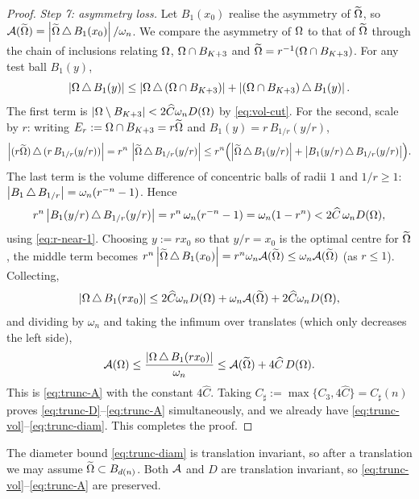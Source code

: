 \begin{proof}
\smallskip
\emph{Step 7: asymmetry loss.}
Let $B_1(x_0)$ realise the asymmetry of $\widetilde{\Omega}$, so
$\mathcal A(\widetilde{\Omega})=\left|\widetilde{\Omega}\,\triangle\,B_1(x_0)\right|/\omega_n$. We compare the
asymmetry of $\Omega$ to that of $\widetilde{\Omega}$ through the chain of inclusions
relating $\Omega$, $\Omega\cap B_{K+3}$ and $\widetilde{\Omega}=r^{-1}(\Omega\cap B_{K+3})$.
For any test ball $B_1(y)$,
\[
   \left|\Omega\,\triangle\,B_1(y)\right|
   \le\left|\Omega\,\triangle\,(\Omega\cap B_{K+3})\right|
     +\left|(\Omega\cap B_{K+3})\,\triangle\,B_1(y)\right|.
\]
The first term is $\left|\Omega\setminus B_{K+3}\right|<2\widehat C\omega_n D(\Omega)$
by \eqref{eq:vol-cut}. For the second, scale by $r$: writing
$E_r:=\Omega\cap B_{K+3}=r\widetilde{\Omega}$ and $B_1(y)=r\,B_{1/r}(y/r)$,
\[
   \left|(r\widetilde{\Omega})\,\triangle\,(r\,B_{1/r}(y/r))\right|
   =r^n\,\left|\widetilde{\Omega}\,\triangle\,B_{1/r}(y/r)\right|
   \le r^n\Bigl(\left|\widetilde{\Omega}\,\triangle\,B_1(y/r)\right|
              +\left|B_1(y/r)\,\triangle\,B_{1/r}(y/r)\right|\Bigr).
\]
The last term is the volume difference of concentric balls of radii $1$
and $1/r\ge1$:
$\left|B_1\,\triangle\,B_{1/r}\right|=\omega_n(r^{-n}-1)$. Hence
\[
   r^n\left|B_1(y/r)\,\triangle\,B_{1/r}(y/r)\right|
   =r^n\,\omega_n(r^{-n}-1)=\omega_n(1-r^n)
   <2\widehat C\,\omega_n D(\Omega),
\]
using \eqref{eq:r-near-1}. Choosing $y:=r x_0$ so that $y/r=x_0$ is the
optimal centre for $\widetilde{\Omega}$, the middle term becomes
$r^n\left|\widetilde{\Omega}\,\triangle\,B_1(x_0)\right|=r^n\omega_n\mathcal A(\widetilde{\Omega})
\le\omega_n\mathcal A(\widetilde{\Omega})$ (as $r\le1$). Collecting,
\[
   \left|\Omega\,\triangle\,B_1(rx_0)\right|
   \le2\widehat C\omega_n D(\Omega)+\omega_n\mathcal A(\widetilde{\Omega})+2\widehat C\omega_n D(\Omega),
\]
and dividing by $\omega_n$ and taking the infimum over translates (which
only decreases the left side),
\begin{equation}\label{eq:trunc-A-pre}
   \mathcal A(\Omega)\le\frac{\left|\Omega\,\triangle\,B_1(rx_0)\right|}{\omega_n}
   \le\mathcal A(\widetilde{\Omega})+4\widehat C\,D(\Omega).
\end{equation}
This is \eqref{eq:trunc-A} with the constant $4\widehat C$. Taking
$C_\sharp:=\max\{C_3,4\widehat C\}=C_\sharp(n)$ proves
\eqref{eq:trunc-D}--\eqref{eq:trunc-A} simultaneously, and we already have
\eqref{eq:trunc-vol}--\eqref{eq:trunc-diam}. This completes the proof.
\end{proof}

\begin{remark}\label{rem:translate}
The diameter bound \eqref{eq:trunc-diam} is translation invariant, so
after a translation we may assume $\widetilde{\Omega}\subset B_{d(n)}$. Both
$\mathcal A$ and $D$ are translation invariant, so
\eqref{eq:trunc-vol}--\eqref{eq:trunc-A} are preserved.
\end{remark}

